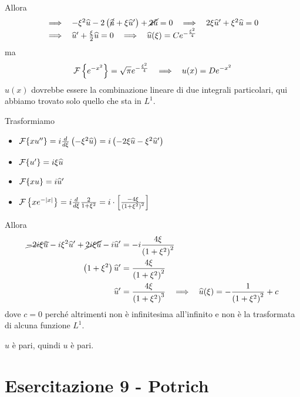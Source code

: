Allora
\begin{equation*}
\begin{array}{l}
\implies \ \ - \xi^{2}\hat{u} - 2\left(\cancel{\hat{u}} + \xi \hat{u} '\right) + \cancel{2\hat{u}} = 0\ \ \implies \ \ 2\xi \hat{u} ' + \xi^{2}\hat{u} = 0\\
\implies \ \ \hat{u} ' + \frac{\xi}{2}\hat{u} = 0\ \ \implies \ \ \hat{u}(\xi) = Ce^{- \frac{\xi^{2}}{4}}
\end{array}
\end{equation*}
ma
\begin{equation*}
\Fc \left\{e^{- x^{2}}\right\} = \sqrt{\pi} e^{- \frac{\xi^{2}}{4}} \ \ \implies \ \ u(x) = De^{- x^{2}}
\end{equation*}
$u(x)$ dovrebbe essere la combinazione lineare di due integrali particolari, qui abbiamo trovato solo quello che sta in $L^{1}$.
\Soluzione

Trasformiamo
\begin{itemize}
\item $\Fc \{xu''\} = i\frac{d}{d\xi}\left(- \xi^{2}\hat{u}\right) = i\left(- 2\xi \hat{u} - \xi^{2}\hat{u} '\right)$
\item $\Fc \{u'\} = i\xi \hat{u}$
\item $\Fc \{xu\} = i\hat{u} '$
\item $\Fc \left\{xe^{- | x|}\right\} = i\frac{d}{d\xi}\frac{2}{1 + \xi^{2}} = i \cdot \left[\frac{- 4\xi}{\left(1 + \xi^{2}\right)^{2}}\right]$
\end{itemize}

Allora
\begin{equation*}
\begin{aligned}
\cancel{- 2i\xi \hat{u}} - i\xi^{2}\hat{u} ' + \cancel{2i\xi \hat{u}} - i\hat{u} ' & = - i\frac{4\xi}{\left(1 + \xi^{2}\right)^{2}}\\
\left(1 + \xi^{2}\right)\hat{u} ' & = \frac{4\xi}{\left(1 + \xi^{2}\right)^{2}}\\
\hat{u} ' & = \frac{4\xi}{\left(1 + \xi^{2}\right)^{3}} \ \ \implies \ \ \hat{u}(\xi) = - \frac{1}{\left(1 + \xi^{2}\right)^{2}} + c
\end{aligned}
\end{equation*}
dove $c = 0$ perché altrimenti non è infinitesima all'infinito e non è la trasformata di alcuna funzione $L^{1}$.

$\hat{u}$ è pari, quindi $u$ è pari.
\chapter{Esercitazione 9 - Potrich}
\ParteEsercizi
\Esercizio{}

